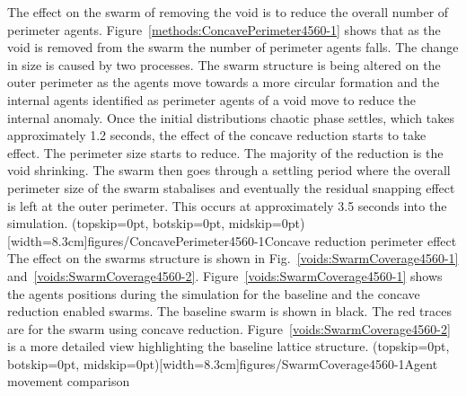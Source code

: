 \documentclass{ieeeaccess}
\begin{document}
The effect on the swarm of removing the void is to reduce the overall number of perimeter agents. Figure~\ref{methods:ConcavePerimeter4560-1} shows that as the void is removed from the swarm the number of perimeter agents falls. The change in size is caused by two processes. The swarm structure is being altered on the outer perimeter as the agents move towards a more circular formation and the internal agents identified as perimeter agents of a void move to reduce the internal anomaly. 
Once the initial distributions chaotic phase settles, which takes approximately 1.2 seconds, the effect of the concave reduction starts to take effect. The perimeter size starts to reduce. The majority of the reduction is the void shrinking. The swarm then goes through a settling period where the overall perimeter size of the swarm stabalises and eventually the residual snapping effect is left at the outer perimeter. This occurs at approximately 3.5 seconds into the simulation. 
\Figure[t!](topskip=0pt, botskip=0pt, midskip=0pt)[width=8.3cm]{figures/ConcavePerimeter4560-1}{Concave reduction perimeter effect\label{methods:ConcavePerimeter4560-1}}
The effect on the swarms structure is shown in Fig.~\ref{voids:SwarmCoverage4560-1} and~\ref{voids:SwarmCoverage4560-2}. Figure~\ref{voids:SwarmCoverage4560-1} shows the agents positions during the simulation for the baseline and the concave reduction enabled swarms. The baseline swarm is shown in black. The red traces are for the swarm using concave reduction. Figure~\ref{voids:SwarmCoverage4560-2} is a more detailed view highlighting the baseline lattice structure.
\Figure[t!](topskip=0pt, botskip=0pt, midskip=0pt)[width=8.3cm]{figures/SwarmCoverage4560-1}{Agent movement comparison\label{voids:SwarmCoverage4560-1}}
\end{document}

